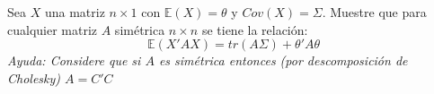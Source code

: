 

\addpoints
\question[10] Sea $X$ una matriz $n\times 1$ con $\mathbb{E}(X)=\theta$ y $Cov(X)=\Sigma$. Muestre que para cualquier matriz $A$ simétrica $n\times n$ se tiene la relación:
$$\mathbb{E}(X'AX)=tr(A\Sigma)+\theta' A \theta$$
\textit{Ayuda: Considere que si $A$ es simétrica entonces (por descomposición de Cholesky) $A=C'C$}


